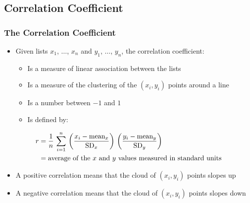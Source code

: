 \documentclass[t]{beamer}
\begin{document}
\subsection{Correlation Coefficient}
\begin{frame}[t]\frametitle{The Correlation Coefficient}
{\small
\begin{itemize}
\item Given lists $x_1$, $\dots$, $x_n$ and $y_1$, $\dots$, $y_n$, the correlation
  coefficient:
  \begin{itemize} 
     \item Is a measure of linear association between the lists
     \item Is a measure of the clustering of the $(x_i, y_i)$ points around a line
     \item Is a number between $-1$ and $1$
     \item Is defined by:\vspace{-10pt}
   \end{itemize}
\end{itemize}
\begin{align*}
r &=\frac{1}{n}\,\sum_{i=1}^n\,\left(\frac{x_i - \mbox{mean}_x}{\mbox{SD}_x}\right)\,
  \left(\frac{y_i - \mbox{mean}_y}{\mbox{SD}_y}\right)\\
  &= \mbox{average of the $x$ and $y$ values measured in standard units}\vspace{-20pt}
\end{align*}\vspace{-15pt}
\begin{itemize}
\item A positive correlation means that the cloud of $(x_i, y_i)$ points slopes up
\item A negative correlation means that the cloud of $(x_i, y_i)$ points slopes down
\end{itemize}

}
\end{frame}
\end{document}

